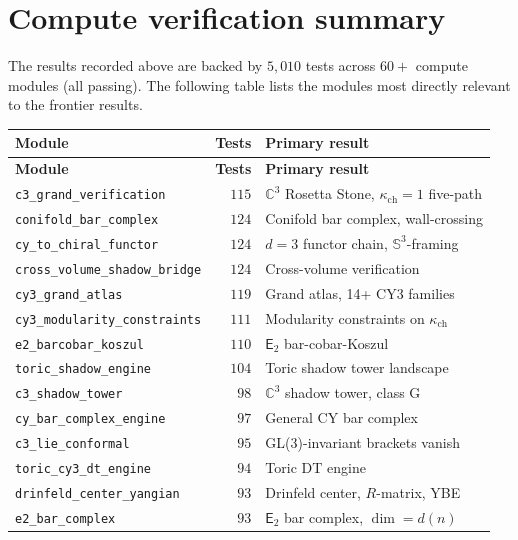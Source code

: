 \documentclass[11pt]{article}
\newcommand{\C}{\mathbb{C}}
\newcommand{\bS}{\mathbb{S}}
\newcommand{\Etwo}{\mathsf{E}_2}
\begin{document}
\section{Compute verification summary}
\label{sec:compute-summary}

The results recorded above are backed by $5{,}010$ tests across $60+$ compute modules (all passing). The following table lists the modules most directly relevant to the frontier results.

\begin{center}
\renewcommand{\arraystretch}{1.2}
\small
\begin{longtable}{lrl}
 \toprule
 \textbf{Module} & \textbf{Tests} & \textbf{Primary result} \\
 \midrule
 \endfirsthead
 \toprule
 \textbf{Module} & \textbf{Tests} & \textbf{Primary result} \\
 \midrule
 \endhead
 \texttt{c3\_grand\_verification} & $115$ & $\C^3$ Rosetta Stone, $\kappa_{\mathrm{ch}} = 1$ five-path \\
 \texttt{conifold\_bar\_complex} & $124$ & Conifold bar complex, wall-crossing \\
 \texttt{cy\_to\_chiral\_functor} & $124$ & $d = 3$ functor chain, $\bS^3$-framing \\
 \texttt{cross\_volume\_shadow\_bridge} & $124$ & Cross-volume verification \\
 \texttt{cy3\_grand\_atlas} & $119$ & Grand atlas, 14+ CY3 families \\
 \texttt{cy3\_modularity\_constraints} & $111$ & Modularity constraints on $\kappa_{\mathrm{ch}}$ \\
 \texttt{e2\_barcobar\_koszul} & $110$ & $\Etwo$ bar-cobar-Koszul \\
 \texttt{toric\_shadow\_engine} & $104$ & Toric shadow tower landscape \\
 \texttt{c3\_shadow\_tower} & $98$ & $\C^3$ shadow tower, class G \\
 \texttt{cy\_bar\_complex\_engine} & $97$ & General CY bar complex \\
 \texttt{c3\_lie\_conformal} & $95$ & GL(3)-invariant brackets vanish \\
 \texttt{toric\_cy3\_dt\_engine} & $94$ & Toric DT engine \\
 \texttt{drinfeld\_center\_yangian} & $93$ & Drinfeld center, $R$-matrix, YBE \\
 \texttt{e2\_bar\_complex} & $93$ & $\Etwo$ bar complex, $\dim = d(n)$ \\

\end{longtable}
\end{center}
\end{document}
